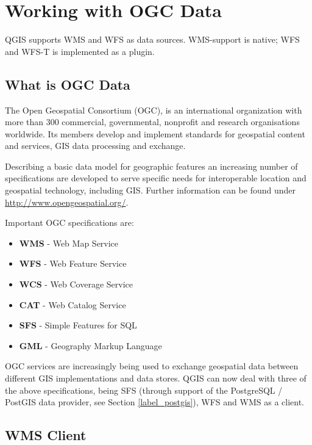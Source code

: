 \chapter{Working with OGC Data}\label{working_with_ogc}


QGIS supports WMS and WFS as data sources. WMS-support is native; WFS and WFS-T is
implemented as a plugin.

\section{What is OGC Data}

The Open Geospatial Consortium (OGC), is an international organization with more than 300
commercial, governmental, nonprofit and research organisations worldwide. Its members
develop and implement standards for geospatial content and services, GIS data processing
and exchange.

Describing a basic data model for geographic features an increasing number of specifications
are developed to serve specific needs for interoperable location and geospatial technology,
including GIS. Further information can be found under \url{http://www.opengeospatial.org/}.

Important OGC specifications are:

\begin{itemize}[label=--]
\item \textbf{WMS} - Web Map Service
\item \textbf{WFS} - Web Feature Service
\item \textbf{WCS} - Web Coverage Service
\item \textbf{CAT} - Web Catalog Service
\item \textbf{SFS} - Simple Features for SQL
\item \textbf{GML} - Geography Markup Language
\end{itemize}

OGC services are increasingly being used to exchange geospatial data between
different GIS implementations and data stores.  QGIS can now deal with three of the
above specifications, being SFS (through support of the PostgreSQL / PostGIS
data provider, see Section \ref{label_postgis}), WFS and WMS as a client.

\section{WMS Client}\label{sec:ogc-wms}

